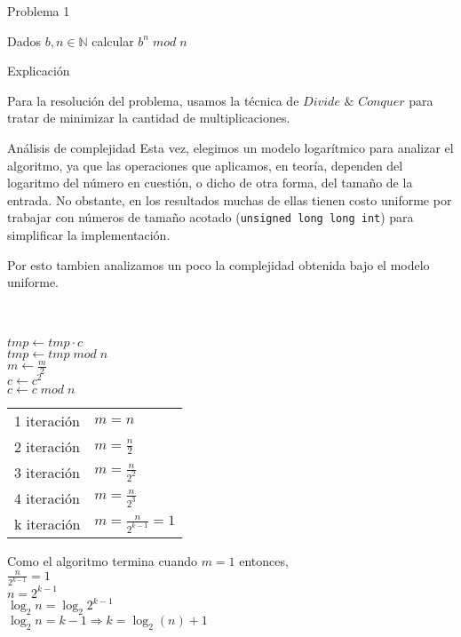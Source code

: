\begin{section}{Problema 1}

	Dados $b,n \in \mathbb{N} $ calcular $b^n\; mod\; n$

	\begin{subsection}{Explicación}

		Para la resolución del problema, usamos la técnica de $Divide$ $\&$ $Conquer$ para tratar de minimizar la cantidad
	de multiplicaciones. 

		\begin{subsubsection}{Análisis de complejidad}
		Esta vez, elegimos un modelo logarítmico para analizar el algoritmo, ya que las operaciones que aplicamos, 
		en teoría, dependen del logaritmo del número en cuestión, o dicho de otra forma, del tamaño de la entrada.
		No obstante, en los resultados muchas de ellas tienen costo uniforme por trabajar con números de tamaño acotado (\texttt{unsigned long long int}) para simplificar la implementación.

		Por esto tambien analizamos un poco la complejidad obtenida bajo el modelo uniforme. \\

		\begin{pseudo}
			 \\
			\tab {} \\
			\tab \tab $tmp \leftarrow tmp \cdot c$ \\
			\tab \tab $tmp \leftarrow tmp\; mod\; n$ \\
			\tab $m \leftarrow \frac{m}{2}$ \\
			\tab $c \leftarrow c^2$ \\
			\tab $c \leftarrow c\; mod\; n$
			
		\end{pseudo}

		\begin{tabular}{l l}
			1 iteración & $m = n$ \\
			2 iteración & $m = \frac{n}{2}$ \\
			3 iteración & $m = \frac{n}{2^2}$ \\
			4 iteración & $m = \frac{n}{2^3}$ \\
			k iteración & $m = \frac{n}{2^{k-1}} = 1$  
		\end{tabular}

		Como el algoritmo termina cuando $m=1$ entonces, \\
			$\frac{n}{2^{k-1}} = 1$ \\
			$n = 2^{k-1}$ \\
			$\log_2 n = \log_2 2^{k-1}$ \\
			$\log_2 n = k-1 \Rightarrow k = \log_2( n )+1 $ \\


\end{subsubsection}
\end{subsection}
\end{section}
